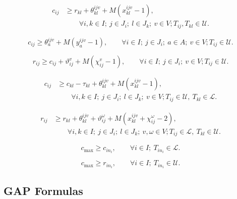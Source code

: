 \documentclass[11pt]{article}
\begin{document}
\begin{equation}
\begin{aligned}
c_{ij}
&\ge
r_{kl}
+
\theta_{kl}^{ijv}
+
M\left(x_{kl}^{ijv}-1\right),\\
&\qquad
\forall i,k \in I;\ j \in J_i;\ l \in J_k;\ v \in V;
T_{ij},T_{kl}\in\mathcal{U}.
\end{aligned}
\tag{B23}
\end{equation}

\begin{equation}
c_{ij}
\ge
\theta_a^{ijv}
+
M\left(y_a^{ijv}-1\right),
\qquad
\forall i \in I;\ j \in J_i;\ a \in A;\ v \in V;
T_{ij}\in\mathcal{U}.
\tag{B24}
\end{equation}

\begin{equation}
r_{ij}
\ge
c_{ij}
+
\vartheta_{ij}^{v}
+
M\left(\chi_{ij}^{v}-1\right),
\qquad
\forall i \in I;\ j \in J_i;\ v \in V;
T_{ij}\in\mathcal{U}.
\tag{B25}
\end{equation}

\begin{equation}
\begin{aligned}
c_{ij}
&\ge
c_{kl}-\tau_{kl}
+
\theta_{kl}^{ijv}
+
M\left(x_{kl}^{ijv}-1\right),\\
&\qquad
\forall i,k \in I;\ j \in J_i;\ l \in J_k;\ v \in V;
T_{ij}\in\mathcal{U},\ T_{kl}\in\mathcal{L}.
\end{aligned}
\tag{B26}
\end{equation}

\begin{equation}
\begin{aligned}
r_{ij}
&\ge
r_{kl}
+
\theta_{kl}^{ijv}
+
\vartheta_{ij}^{\omega}
+
M\left(x_{kl}^{ijv}+\chi_{ij}^{\omega}-2\right),\\
&\qquad
\forall i,k \in I;\ j \in J_i;\ l \in J_k;\ v,\omega \in V;
T_{ij}\in\mathcal{L},\ T_{kl}\in\mathcal{U}.
\end{aligned}
\tag{B27}
\end{equation}

\begin{equation}
c_{\max} \ge c_{in_i},
\qquad \forall i \in I;\ T_{in_i}\in\mathcal{L}.
\tag{B28}
\end{equation}

\begin{equation}
c_{\max} \ge r_{in_i},
\qquad \forall i \in I;\ T_{in_i}\in\mathcal{U}.
\tag{B29}
\end{equation}

\subsection{GAP Formulas}
\end{document}
